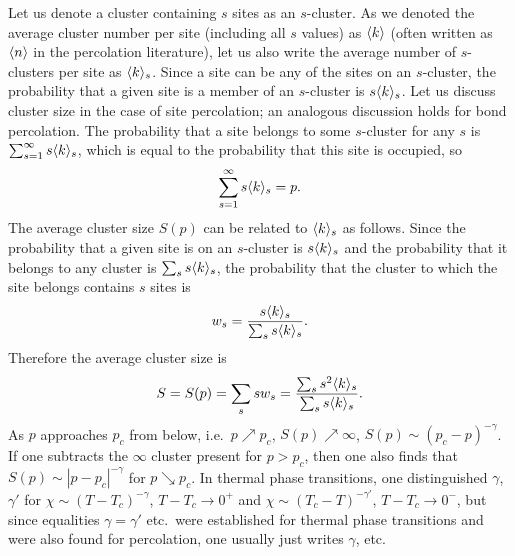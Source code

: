 Let us denote a cluster containing $s$ sites as an $s$-cluster. As we denoted the average cluster number per site
(including all $s$ values) as $\langle k\rangle$ (often written as $\langle n\rangle$ in the percolation literature), let us also write the
average number of $s$-clusters per site as $\langle k\rangle_s$. Since a site can be any of the sites on an $s$-cluster, the probability
that a given site is a member of an $s$-cluster is $s\langle k\rangle_s$. Let us discuss cluster size in the case of site percolation;
an analogous discussion holds for bond percolation. The probability that a site belongs to some $s$-cluster for any $s$ is
$\sum_{s=1}^\infty s\langle k\rangle_s$, which is equal to the probability that this site is occupied, so
\begin{equation}
  \sum_{s=1}^\infty s\langle k\rangle_s = p .
\end{equation}
The average cluster size $S(p)$ can be related to $\langle k\rangle_s$ as follows. Since the probability that a given site is on an
$s$-cluster is $s\langle k\rangle_s$ and the probability that it belongs to any cluster is $\sum_ss\langle k\rangle_s$, the probability that the
cluster to which the site belongs contains $s$ sites is
\begin{equation}
  w_s = \frac{s\langle k\rangle_s}{\sum_ss\langle k\rangle_s}.
\end{equation}
Therefore the average cluster size is
\begin{equation}
  S = S(p) = \sum_ssw_s = \frac{\sum_ss^2\langle k\rangle_s}{\sum_ss\langle k\rangle_s}.
\end{equation}
As $p$ approaches $p_c$ from below, i.e.\ $p\nearrow p_c$, $S(p)\nearrow\infty$, $S(p)\sim(p_c-p)^{-\gamma}$. If one
subtracts the $\infty$ cluster present for $p>p_c$, then one also finds that $S(p)\sim|p-p_c|^{-\gamma}$ for $p\searrow p_c$.
In thermal phase transitions, one distinguished $\gamma$, $\gamma'$ for $\chi\sim(T-T_c)^{-\gamma}$, $T-T_c\to 0^+$ and
$\chi\sim(T_c-T)^{-\gamma'}$, $T-T_c\to 0^-$, but since equalities $\gamma = \gamma'$ etc.\ were established for thermal phase
transitions and were also found for percolation, one usually just writes $\gamma$, etc.

